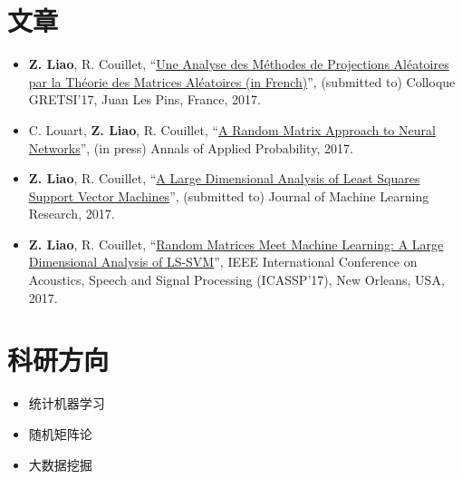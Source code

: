 \documentclass[margin]{res}
\begin{document}
\begin{CJK}{UTF8}{gbsn}
\begin{resume}


\section{文章}
\begin{itemize}
\item \textbf{Z. Liao}, R. Couillet, ``\href{https://zhenyu-liao.github.io/pdf/RMT4ELM-GRETSI.pdf}{Une Analyse des Méthodes de Projections Aléatoires par la Théorie des Matrices Aléatoires (in French)}'', (submitted to) Colloque GRETSI'17, Juan Les Pins, France, 2017.
\item C. Louart, \textbf{Z. Liao}, R. Couillet, ``\href{https://zhenyu-liao.github.io/pdf/RMT4ELM-AAP.pdf}{A Random Matrix Approach to Neural Networks}'', (in press) Annals of Applied Probability, 2017.
\item \textbf{Z. Liao}, R. Couillet, ``\href{https://zhenyu-liao.github.io/pdf/RMT4LSSVM-JMLR.pdf}{A Large Dimensional Analysis of Least Squares Support Vector Machines}'', (submitted to) Journal of Machine Learning Research, 2017.
\item \textbf{Z. Liao}, R. Couillet, ``\href{https://zhenyu-liao.github.io/pdf/RMT4LSSVM-ICASSP.pdf}{Random Matrices Meet Machine Learning: A Large Dimensional Analysis of LS-SVM}'', IEEE International Conference on Acoustics, Speech and Signal Processing (ICASSP'17), New Orleans, USA, 2017.
\end{itemize}


\section{科研方向}
\begin{itemize}
\item 统计机器学习
\item 随机矩阵论
\item 大数据挖掘
\end{itemize}


\end{resume}
\end{CJK}
\end{document}
